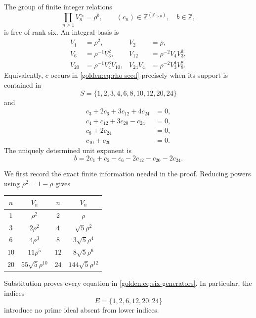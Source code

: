 \begin{theorem}
\label{golden:thm:integral-lattice}
The group of finite integer relations
\begin{equation}
 \prod_{n\ge1}V_n^{c_n}=\rho^b,
 \qquad (c_n)\in\mathbb Z^{(\mathbb Z_{>0})},\quad b\in\mathbb Z,
 \label{golden:eq:rho-seed}
\end{equation}
is free of rank six.  An integral basis is
\begin{equation}
\begin{aligned}
 V_1&=\rho^2,&
 V_2&=\rho,\\
 V_6&=\rho^{-1}V_3^2,&
 V_{12}&=\rho^{-2}V_4V_3^3,\\
 V_{20}&=\rho^{-1}V_4^3V_{10},&
 V_{24}V_4&=\rho^{-2}V_3^4V_8^2.
\end{aligned}
\label{golden:eq:six-generators}
\end{equation}
Equivalently, $c$ occurs in \eqref{golden:eq:rho-seed} precisely when
its support is contained in
\begin{equation}
 S=\{1,2,3,4,6,8,10,12,20,24\}
 \label{golden:eq:full-support}
\end{equation}
and
\begin{equation}
\begin{aligned}
 c_3+2c_6+3c_{12}+4c_{24}&=0,\\
 c_4+c_{12}+3c_{20}-c_{24}&=0,\\
 c_8+2c_{24}&=0,\\
 c_{10}+c_{20}&=0.
\end{aligned}
\label{golden:eq:four-constraints}
\end{equation}
The uniquely determined unit exponent is
\begin{equation}
 b=2c_1+c_2-c_6-2c_{12}-c_{20}-2c_{24}.
 \label{golden:eq:unit-exponent}
\end{equation}
\end{theorem}

We first record the exact finite information needed in the proof.
Reducing powers using $\rho^2=1-\rho$ gives
\begin{center}
\small
\begin{tabular}{c|c@{\qquad}c|c}
$n$ & $V_n$ & $n$ & $V_n$\\ \hline
$1$ & $\rho^2$ & $2$ & $\rho$\\
$3$ & $2\rho^2$ & $4$ & $\sqrt5\rho^2$\\
$6$ & $4\rho^3$ & $8$ & $3\sqrt5\rho^4$\\
$10$ & $11\rho^5$ & $12$ & $8\sqrt5\rho^6$\\
$20$ & $55\sqrt5\rho^{10}$ & $24$ & $144\sqrt5\rho^{12}$
\end{tabular}
\end{center}
Substitution proves every equation in
\eqref{golden:eq:six-generators}.  In particular, the indices
\[
 E=\{1,2,6,12,20,24\}
\]
introduce no prime ideal absent from lower indices.

